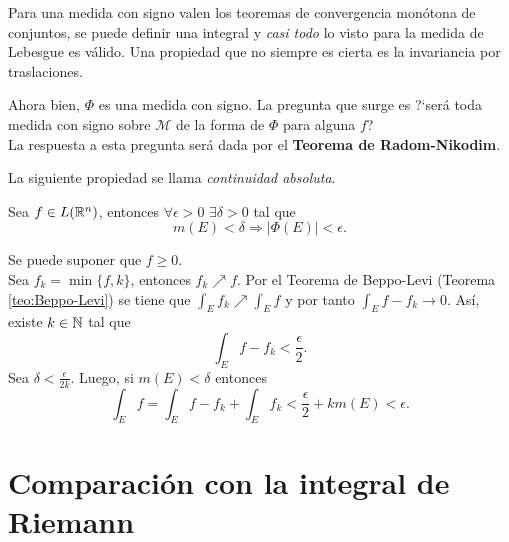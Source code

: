                     
                    Para una medida con signo valen los teoremas de convergencia mon\'otona de conjuntos, se puede definir una integral y \emph{casi todo} lo visto para la medida de Lebesgue es v\'alido. Una propiedad que no siempre es cierta es la invariancia por traslaciones.
                    
                    Ahora bien,  $\Phi$ es una medida con signo. 
                    La pregunta que surge es ?`ser\'a toda medida con signo sobre
                    $\mathcal{M}$ de la forma de $\Phi$ para alguna $f$?\\
                    La respuesta a esta pregunta ser\'a dada por el \textbf{Teorema de Radom-Nikodim}.
                    
                    
                    La siguiente propiedad se llama \emph{continuidad absoluta}.
                    
                    \begin{teorema}{}
                    Sea $f \in L(\mathbb{R}^n)$, entonces $\forall \epsilon>0$ \;$\exists \delta >0$ tal que 
                    \[
                    m(E)<\delta \Longrightarrow |\Phi(E)|<\epsilon.
                    \]
                    \end{teorema}
                    
                    \begin{demo}
                    Se puede suponer que $f\geq 0$. \\
                    Sea $f_k=\min\{f,k\}$, entonces $f_k \nearrow f$.
                    Por el Teorema de Beppo-Levi (Teorema \ref{teo:Beppo-Levi}) se tiene que 
                    $\int_E f_k \nearrow \int_E f$ y por tanto
                    $
                    \int_E f-f_k \to 0.
                    $
                    As\'i, existe $k \in \mathbb{N}$ tal que 
                    \[
                    \int_E f-f_k < \frac{\epsilon}{2}.
                    \]
                    Sea $\delta <\frac{\epsilon}{2k}$. Luego, si $m(E)<\delta$ entonces 
                    \[
                    \int_E f =\int_E f-f_k +\int_E f_k <\frac{\epsilon}{2}+km(E)<\epsilon. 
                    \]
                    \end{demo}
                    
                    \section{Comparaci\'on con la integral de Riemann}
                    
